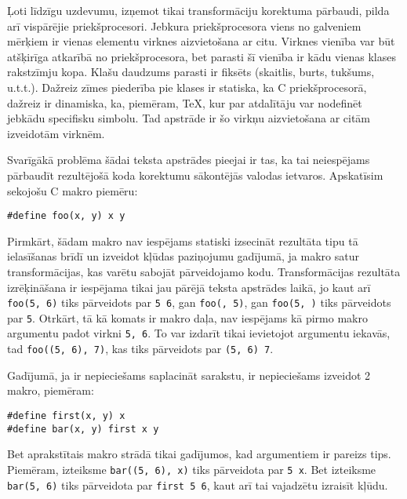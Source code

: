 Ļoti līdzīgu uzdevumu, izņemot tikai transformāciju korektuma pārbaudi, pilda arī vispārējie priekšprocesori. Jebkura priekšprocesora viens no galveniem mērķiem ir vienas elementu virknes aizvietošana ar citu. Virknes vienība var būt atšķirīga atkarībā no priekšprocesora, bet parasti šī vienība ir kādu vienas klases rakstzīmju kopa. Klašu daudzums parasti ir fiksēts (skaitlis, burts, tukšums, u.t.t.). Dažreiz zīmes piederība pie klases ir statiska, ka C priekšprocesorā, dažreiz ir dinamiska, ka, piemēram, \TeX{}, kur par atdalītāju var nodefinēt jebkādu specifisku simbolu. Tad apstrāde ir šo virkņu aizvietošana ar citām izveidotām virknēm.

Svarīgākā problēma šādai teksta apstrādes pieejai ir tas, ka tai neiespējams pārbaudīt rezultējošā koda korektumu sākontējās valodas ietvaros. Apskatīsim sekojošu C makro piemēru:
\begin{verbatim}
#define foo(x, y) x y
\end{verbatim}

Pirmkārt, šādam makro nav iespējams statiski izsecināt rezultāta tipu tā ielasīšanas brīdī un izveidot kļūdas paziņojumu gadījumā, ja makro satur transformācijas, kas varētu sabojāt pārveidojamo kodu. Transformācijas rezultāta izrēķināšana ir iespējama tikai jau pārējā teksta apstrādes laikā, jo kaut arī \verb|foo(5, 6)| tiks pārveidots par \verb|5 6|, gan \verb|foo(, 5)|, gan \verb|foo(5, )| tiks pārveidots par \verb|5|. Otrkārt, tā kā komats ir makro daļa, nav iespējams kā pirmo makro argumentu padot virkni \verb|5, 6|. To var izdarīt tikai ievietojot argumentu iekavās, tad \verb|foo((5, 6), 7)|, kas tiks pārveidots par \verb|(5, 6) 7|.

Gadījumā, ja ir nepieciešams saplacināt sarakstu, ir nepieciešams izveidot 2 makro, piemēram:
\begin{verbatim}
#define first(x, y) x
#define bar(x, y) first x y
\end{verbatim}

Bet aprakstītais makro strādā tikai gadījumos, kad argumentiem ir pareizs tips. Piemēram, izteiksme \verb|bar((5, 6), x)| tiks pārveidota par \verb|5 x|. Bet izteiksme \verb|bar(5, 6)| tiks pārveidota par \verb|first 5 6|, kaut arī tai vajadzētu izraisīt kļūdu. 


